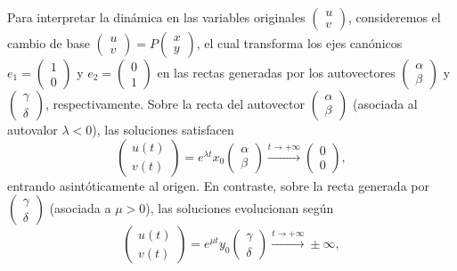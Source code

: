 Para interpretar la dinámica en las variables originales $\begin{pmatrix} u \\ v \end{pmatrix}$, consideremos el cambio de base $\begin{pmatrix} u \\ v \end{pmatrix} = P \begin{pmatrix} x \\ y \end{pmatrix}$, el cual transforma los ejes canónicos $e_1 = \begin{pmatrix} 1 \\ 0 \end{pmatrix}$ y $e_2 = \begin{pmatrix} 0 \\ 1 \end{pmatrix}$ en las rectas generadas por los autovectores $\begin{pmatrix} \alpha \\ \beta \end{pmatrix}$ y $\begin{pmatrix} \gamma \\ \delta \end{pmatrix}$, respectivamente. 
Sobre la recta del autovector $\begin{pmatrix} \alpha \\ \beta \end{pmatrix}$ (asociada al autovalor $\lambda < 0$), las soluciones satisfacen
\[
    \begin{pmatrix} u(t) \\ v(t) \end{pmatrix} = e^{\lambda t} x_0 \begin{pmatrix} \alpha \\ \beta \end{pmatrix} \xrightarrow{t \to +\infty} \begin{pmatrix} 0 \\ 0 \end{pmatrix},
\]
entrando asintóticamente al origen. En contraste, sobre la recta generada por $\begin{pmatrix} \gamma \\ \delta \end{pmatrix}$ (asociada a $\mu > 0$), las soluciones evolucionan según
\[
    \begin{pmatrix} u(t) \\ v(t) \end{pmatrix} = e^{\mu t} y_0 \begin{pmatrix} \gamma \\ \delta \end{pmatrix} \xrightarrow{t \to +\infty} \pm \infty,
\]
